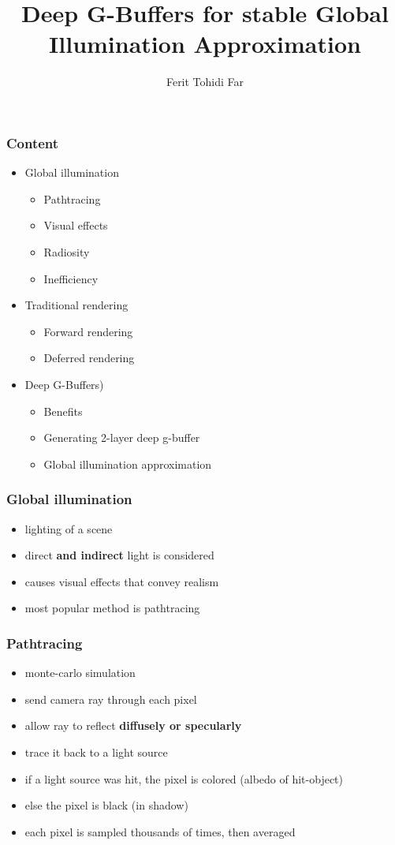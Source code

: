 \documentclass[aspectratio=169]{beamer}
\title{Deep G-Buffers for stable Global Illumination Approximation}
\author{Ferit Tohidi Far}
\begin{document}
	\maketitle

	\begin{frame}
		\frametitle{Content}
		\begin{itemize}
			\item Global illumination
				\begin{itemize}
					\item Pathtracing
					\item Visual effects
					\item Radiosity
					\item Inefficiency
				\end{itemize}
			\item Traditional rendering
				\begin{itemize}
					\item Forward rendering
					\item Deferred rendering
				\end{itemize}
			\item Deep G-Buffers)
				\begin{itemize}
					\item Benefits
					\item Generating 2-layer deep g-buffer
					\item Global illumination approximation
				\end{itemize}
		\end{itemize}
	\end{frame}

	\begin{frame}
		\frametitle{Global illumination}
		\begin{itemize}
			\item lighting of a scene
			\item direct \textbf{and indirect} light is considered
			\item causes visual effects that convey realism
			\item most popular method is pathtracing
		\end{itemize}
	\end{frame}

	\begin{frame}
		\frametitle{Pathtracing}
		\begin{itemize}
			\item monte-carlo simulation
			\item send camera ray through each pixel
			\item allow ray to reflect \textbf{diffusely or specularly}
			\item trace it back to a light source
			\item if a light source was hit, the pixel is colored (albedo of hit-object)
			\item else the pixel is black (in shadow)
			\item each pixel is sampled thousands of times, then averaged
		\end{itemize}
	\end{frame}
\end{document}
